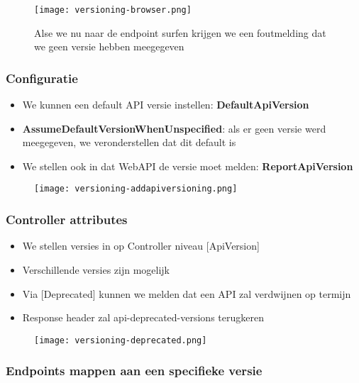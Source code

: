 \documentclass{article}
\begin{document}
\begin{figure}[H]
    \centering
    \texttt{[image: versioning-browser.png]}
    \caption{Alse we nu naar de endpoint surfen krijgen we een foutmelding dat we geen versie hebben meegegeven}
\end{figure}

\subsubsection{Configuratie}

\begin{itemize}
    \item We kunnen een default API versie instellen: \textbf{DefaultApiVersion}
    \item \textbf{AssumeDefaultVersionWhenUnspecified}: als er geen versie werd meegegeven, we veronderstellen dat dit default is
    \item We stellen ook in dat WebAPI de versie moet melden: \textbf{ReportApiVersion}
\end{itemize}

\begin{figure}[H]
    \centering
    \texttt{[image: versioning-addapiversioning.png]}
    \caption{}
\end{figure}

\subsubsection{Controller attributes}

\begin{itemize}
    \item We stellen versies in op Controller niveau [ApiVersion]
    \item Verschillende versies zijn mogelijk
    \item Via [Deprecated] kunnen we melden dat een API zal verdwijnen op termijn
    \item Response header zal api-deprecated-versions terugkeren
\end{itemize}

\begin{figure}[H]
    \centering
    \texttt{[image: versioning-deprecated.png]}
    \caption{}
\end{figure}

\subsubsection{Endpoints mappen aan een specifieke versie}
\end{document}
